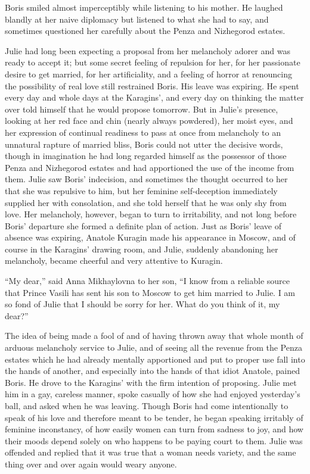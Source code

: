 Boris smiled almost imperceptibly while listening to his
mother. He laughed blandly at her naive diplomacy but listened to
what she had to say, and sometimes questioned her carefully about
the Penza and Nizhegorod estates.

Julie had long been expecting a proposal from her melancholy
adorer and was ready to accept it; but some secret feeling of
repulsion for her, for her passionate desire to get married, for
her artificiality, and a feeling of horror at renouncing the
possibility of real love still restrained Boris. His leave was
expiring. He spent every day and whole days at the Karagins', and
every day on thinking the matter over told himself that he would
propose tomorrow. But in Julie's presence, looking at her red
face and chin (nearly always powdered), her moist eyes, and her
expression of continual readiness to pass at once from melancholy
to an unnatural rapture of married bliss, Boris could not utter
the decisive words, though in imagination he had long regarded
himself as the possessor of those Penza and Nizhegorod estates
and had apportioned the use of the income from them. Julie saw
Boris' indecision, and sometimes the thought occurred to her that
she was repulsive to him, but her feminine self-deception
immediately supplied her with consolation, and she told herself
that he was only shy from love. Her melancholy, however, began to
turn to irritability, and not long before Boris' departure she
formed a definite plan of action. Just as Boris' leave of absence
was expiring, Anatole Kuragin made his appearance in Moscow, and
of course in the Karagins' drawing room, and Julie, suddenly
abandoning her melancholy, became cheerful and very attentive to
Kuragin.

``My dear,'' said Anna Mikhaylovna to her son, ``I know from a
reliable source that Prince Vasili has sent his son to Moscow to
get him married to Julie. I am so fond of Julie that I should be
sorry for her. What do you think of it, my dear?''

The idea of being made a fool of and of having thrown away that
whole month of arduous melancholy service to Julie, and of seeing
all the revenue from the Penza estates which he had already
mentally apportioned and put to proper use fall into the hands of
another, and especially into the hands of that idiot Anatole,
pained Boris. He drove to the Karagins' with the firm intention
of proposing. Julie met him in a gay, careless manner, spoke
casually of how she had enjoyed yesterday's ball, and asked when
he was leaving. Though Boris had come intentionally to speak of
his love and therefore meant to be tender, he began speaking
irritably of feminine inconstancy, of how easily women can turn
from sadness to joy, and how their moods depend solely on who
happens to be paying court to them. Julie was offended and
replied that it was true that a woman needs variety, and the same
thing over and over again would weary anyone.

